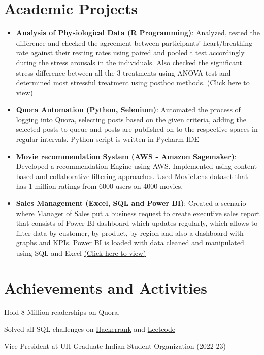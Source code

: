 \documentclass[letterpaper,10.8pt]{article}
\newcommand{\resumeItem}[2]{
  \item\small{
    \textbf{#1}{: #2 \vspace{-2pt}}
  }
}
\newcommand{\resumeSubItem}[2]{\resumeItem{#1}{#2}\vspace{-4pt}}
\newcommand{\resumeSubHeadingListStart}{\begin{itemize}[leftmargin=*]}
\newcommand{\resumeSubHeadingListEnd}{\end{itemize}}
\begin{document}
\section{Academic Projects}
\resumeSubHeadingListStart
\resumeSubItem{Analysis of Physiological Data (R Programming)}{Analyzed, tested the difference and checked the agreement between participants’ heart/breathing rate against their resting rates using paired and pooled t test accordingly during the stress arousals in the individuals. Also checked the significant stress difference between all the 3 treatments using ANOVA test and determined most stressful treatment using posthoc methods. \href{https://rb.gy/qmgw7y}{(Click here to view)}} 
\resumeSubItem{Quora Automation (Python, Selenium)}{Automated the process of logging into Quora, selecting posts based on the given criteria, adding the selected posts to queue and posts are published on to the respective spaces in regular intervals. Python script is written in Pycharm IDE}
\resumeSubItem{Movie recommendation System (AWS - Amazon Sagemaker)}{Developed a recommendation Engine using AWS. Implemented using content-based and collaborative-filtering approaches. Used MovieLens dataset that has 1 million ratings from 6000 users on 4000 movies.}
\resumeSubItem{Sales Management (Excel, SQL and Power BI)}{Created a scenario where Manager of Sales put a business request to create executive sales report that consists of Power BI dashboard which updates regularly, which allows to filter data by customer, by product, by region and also a dashboard with graphs and KPIs. Power BI is loaded with data cleaned and manipulated using SQL and Excel \href{https://rb.gy/zuihet}{(Click here to view)}}\resumeSubHeadingListEnd

\section{Achievements and Activities}
\begin{description}[font=$\bullet$]
\item {Hold 8 Million readerships on Quora.} 
\item {Solved all SQL challenges on \href{https://github.com/DineshNarlakanti/SQL-Hackerrank}{Hackerrank} and \href{https://github.com/DineshNarlakanti/SQL-Leetcode}{Leetcode} \\}
\item {Vice President at UH-Graduate Indian Student Organization (2022-23)}
\end{description}
\end{document}
